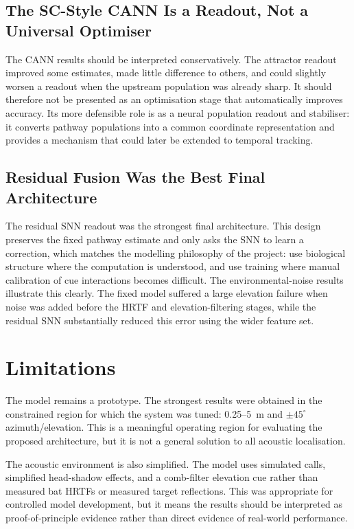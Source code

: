 \subsection{The SC-Style CANN Is a Readout, Not a Universal Optimiser}

The CANN results should be interpreted conservatively. The attractor readout improved some estimates, made little difference to others, and could slightly worsen a readout when the upstream population was already sharp. It should therefore not be presented as an optimisation stage that automatically improves accuracy. Its more defensible role is as a neural population readout and stabiliser: it converts pathway populations into a common coordinate representation and provides a mechanism that could later be extended to temporal tracking.

\subsection{Residual Fusion Was the Best Final Architecture}

The residual SNN readout was the strongest final architecture. This design preserves the fixed pathway estimate and only asks the SNN to learn a correction, which matches the modelling philosophy of the project: use biological structure where the computation is understood, and use training where manual calibration of cue interactions becomes difficult. The environmental-noise results illustrate this clearly. The fixed model suffered a large elevation failure when noise was added before the HRTF and elevation-filtering stages, while the residual SNN substantially reduced this error using the wider feature set.

\section{Limitations}

The model remains a prototype. The strongest results were obtained in the constrained region for which the system was tuned: 0.25--5~m and $\pm45^\circ$ azimuth/elevation. This is a meaningful operating region for evaluating the proposed architecture, but it is not a general solution to all acoustic localisation.

The acoustic environment is also simplified. The model uses simulated calls, simplified head-shadow effects, and a comb-filter elevation cue rather than measured bat HRTFs or measured target reflections. This was appropriate for controlled model development, but it means the results should be interpreted as proof-of-principle evidence rather than direct evidence of real-world performance.

